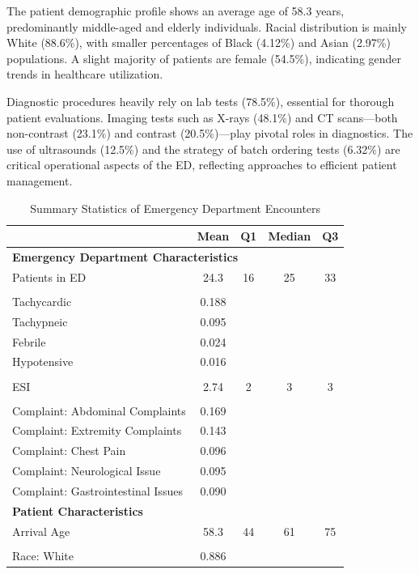 \documentclass[,,nonblindrev]{informs}
\begin{document}
The patient demographic profile shows an average age of 58.3 years,
predominantly middle-aged and elderly individuals. Racial distribution
is mainly White (88.6\%), with smaller percentages of Black (4.12\%) and
Asian (2.97\%) populations. A slight majority of patients are female
(54.5\%), indicating gender trends in healthcare utilization.

Diagnostic procedures heavily rely on lab tests (78.5\%), essential for
thorough patient evaluations. Imaging tests such as X-rays (48.1\%) and
CT scans---both non-contrast (23.1\%) and contrast (20.5\%)---play
pivotal roles in diagnostics. The use of ultrasounds (12.5\%) and the
strategy of batch ordering tests (6.32\%) are critical operational
aspects of the ED, reflecting approaches to efficient patient
management.

\begin{table}[ht]
\centering
\caption{Summary Statistics of Emergency Department Encounters}
\label{tab:summary_statistics}
\begin{tabular}{p{10.5cm}cccc}
\toprule
\textbf{} & \textbf{Mean} & \textbf{Q1} & \textbf{Median} & \textbf{Q3} \\
\midrule
\multicolumn{5}{l}{\textbf{Emergency Department Characteristics}} \\
Patients in ED & 24.3 & 16 & 25 & 33 \\
\\
Tachycardic & 0.188 & & & \\
Tachypneic & 0.095 & & & \\
Febrile & 0.024 & & & \\
Hypotensive & 0.016 & & & \\
\\
ESI & 2.74 & 2 & 3 & 3 \\
\\
Complaint: Abdominal Complaints & 0.169 & & & \\
Complaint: Extremity Complaints & 0.143 & & & \\
Complaint: Chest Pain & 0.096 & & & \\
Complaint: Neurological Issue & 0.095 & & & \\
Complaint: Gastrointestinal Issues & 0.090 & & & \\
\midrule
\multicolumn{5}{l}{\textbf{Patient Characteristics}} \\
Arrival Age & 58.3 & 44 & 61 & 75 \\
\\
Race: White & 0.886 & & & \\

\end{tabular}
\end{table}
\end{document}

